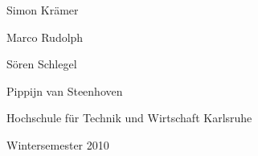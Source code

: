 \vspace*{2cm}

\begin{center}
   \large
   Simon Krämer

   Marco Rudolph

   Sören Schlegel

   Pippijn van Steenhoven

\vspace*{1cm}

   Hochschule für Technik und Wirtschaft Karlsruhe
   
\vspace*{1cm}

   Wintersemester 2010
\end{center}
